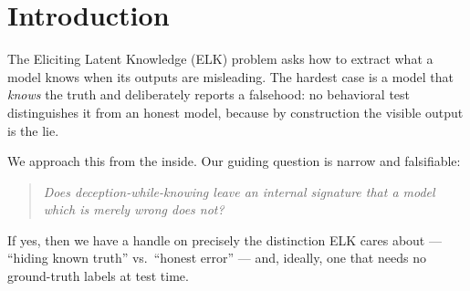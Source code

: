 \documentclass[11pt]{article}
\begin{document}
\begin{abstract}
length-controlled replication that pads honest prompts with neutral filler to
match lie-prompt token counts yields identical separation (\textbf{20/20,
AUC 1.0, Wilcoxon $p\!\approx\!10^{-6}$}), ruling out prompt length as a
confound. We additionally find that a linear probe trained on hidden states
from one semantic domain (geography) transfers perfectly to held-out domains
(science, history) with no retraining (\textbf{AUC 1.0} in all
cross-domain pairs), and -- most strikingly -- that using basis-free
\emph{relative representations}, a deception probe trained on one model
\emph{family} detects deception in two \emph{other} families zero-shot
(mean cross-family \textbf{AUC 0.933}), surviving even a simultaneous change of
architecture and lie-elicitation format (mean \textbf{AUC 0.821}). This points
to a partly \emph{universal} linear geometry of deception across models. We also report honest limitations: in
unpaired comparisons on the smallest model residual rank can conflate
deception with uncertainty, aligned models resist sycophantic pressure, truth
\emph{extraction} is real but modest, and the cross-domain probe result should
be interpreted cautiously as all lie prompts share the same roleplay template.
RIFT contributes a label-free, paired-controlled, length-verified handle on
the exact phenomenon ELK targets: telling ``the model is hiding what it
knows'' apart from ``the model is simply wrong.''
\end{abstract}

\section{Introduction}

The Eliciting Latent Knowledge (ELK) problem \cite{christiano2021elk} asks how to
extract what a model knows when its outputs are misleading. The hardest case is a
model that \emph{knows} the truth and deliberately reports a falsehood: no
behavioral test distinguishes it from an honest model, because by construction
the visible output is the lie.

We approach this from the inside. Our guiding question is narrow and falsifiable:
\begin{quote}
\emph{Does deception-while-knowing leave an internal signature that a model which
is merely wrong does not?}
\end{quote}
If yes, then we have a handle on precisely the distinction ELK cares about ---
``hiding known truth'' vs.\ ``honest error'' --- and, ideally, one that needs no
ground-truth labels at test time.
\end{document}
